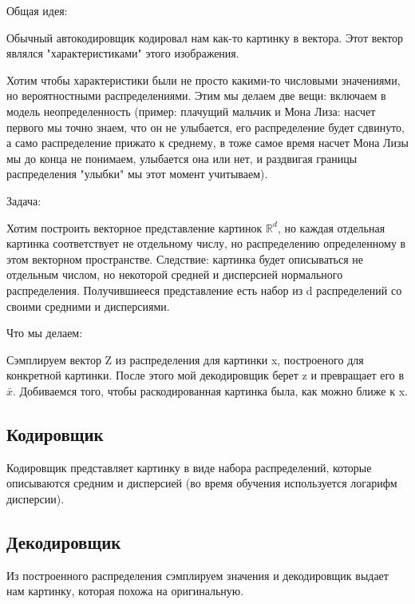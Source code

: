 
	
	Общая идея: 
	
	Обычный автокодировщик кодировал нам как-то картинку в вектора. Этот вектор являлся "характеристиками" этого изображения. 
	
	Хотим чтобы характеристики были не просто какими-то числовыми значениями, но вероятностными распределениями. Этим мы делаем две вещи: включаем в модель неопределенность (пример: плачущий мальчик и Мона Лиза: насчет первого мы точно знаем, что он не улыбается, его распределение будет сдвинуто, а само распределение прижато к среднему, в тоже самое время насчет Мона Лизы мы до конца не понимаем, улыбается она или нет, и раздвигая границы распределения "улыбки" мы этот момент учитываем). 
	
	Задача:
	
	Хотим построить векторное представление картинок $\mathbb{R}^{d}$, но каждая отдельная картинка соответствует не отдельному числу, но распределению определенному в этом векторном пространстве. Следствие: картинка будет описываться не отдельным числом, но некоторой средней и дисперсией нормального распределения. Получившиееся представление есть набор из d распределений со своими средними и дисперсиями. 
	
	Что мы делаем: 
	
	Сэмплируем вектор Z из распределения для картинки x, построеного для конкретной картинки. После этого мой декодировщик берет z и превращает его в $\bar x$.  Добиваемся того, чтобы раскодированная картинка была, как можно ближе к x.
	
	
	\subsection{Кодировщик}
	
	Кодировщик представляет картинку в виде набора распределений, которые описываются средним и дисперсией (во время обучения используется логарифм дисперсии). 

	
	\subsection{Декодировщик}
	
	Из построенного распределения сэмплируем значения и декодировщик выдает нам картинку, которая похожа на оригинальную. 
